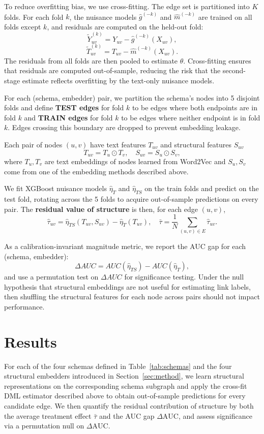 \documentclass{article}
\theoremstyle{plain}
\theoremstyle{definition}
\theoremstyle{remark}
\begin{document}
To reduce overfitting bias, we use cross-fitting. The edge set is partitioned into $K$ folds. For each fold $k$, the nuisance models $\hat{g}^{(-k)}$ and $\hat{m}^{(-k)}$ are trained on all folds except $k$, and residuals are computed on the held-out fold:
\[
\tilde{Y}_{uv}^{(k)} = Y_{uv} - \hat{g}^{(-k)}(X_{uv}),
\]
\[
\tilde{T}_{uv}^{(k)} = T_{uv} - \hat{m}^{(-k)}(X_{uv}).
\]
The residuals from all folds are then pooled to estimate $\theta$. Cross-fitting ensures that residuals are computed out-of-sample, reducing the risk that the second-stage estimate reflects overfitting by the text-only nuisance models.

For each (schema, embedder) pair, we partition the schema's nodes into 5 disjoint folds and define \textbf{TEST edges} for fold $k$ to be edges where both endpoints are in fold $k$ and \textbf{TRAIN edges} for fold $k$ to be edges where neither endpoint is in fold $k$. Edges crossing this boundary are dropped to prevent embedding leakage.

Each pair of nodes $(u,v)$ have text features $T_{uv}$ and structural features $S_{uv}$
$$
T_{uv} = T_u \odot T_v, \quad S_{uv} = S_u\odot S_v,
$$
where $T_u, T_v$ are text embeddings of nodes learned from Word2Vec \citep{word2vec} and $S_u, S_v$ come from one of the embedding methods described above.

We fit XGBoost nuisance models $\hat \eta _T$ and $\hat \eta _{TS}$ on the train folds and predict on the test fold, rotating across the 5 folds to acquire out-of-sample predictions on every pair. The \textbf{residual value of structure} is then, for each edge $(u,v)$,
$$
\hat \tau_{uv} = \hat\eta_{TS}(T_{uv}, S_{uv}) - \hat\eta_T (T_{uv}), \quad \bar \tau = \frac 1N \sum_{(u,v) \in E}\hat\tau_{uv}.
$$

As a calibration-invariant magnitude metric, we report the AUC gap for each (schema, embedder): $$\Delta AUC = AUC(\hat \eta_{TS} ) - AUC(\hat\eta_{T}),$$ and use a permutation test on $\Delta AUC$ for significance testing. Under the null hypothesis that structural embeddings are not useful for estimating link labels, then shuffling the structural features for each node across pairs should not impact performance.

\section{Results}

For each of the four schemas defined in Table~\ref{tab:schemas} and the four structural embedders introduced in Section~\ref{sec:method}, we learn structural representations on the corresponding schema subgraph and apply the cross-fit DML estimator described above to obtain out-of-sample predictions for every candidate edge. We then quantify the residual contribution of structure by both the average treatment effect $\bar\tau$ and the AUC gap $\Delta\mathrm{AUC}$, and assess significance via a permutation null on $\Delta\mathrm{AUC}$.
\end{document}
